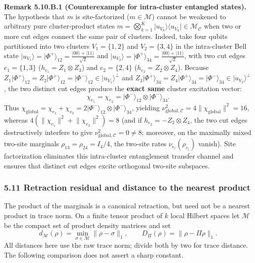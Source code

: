 \documentclass[
  11pt,
]{article}
\begin{document}
\textbf{Remark 5.10.B.1 (Counterexample for intra-cluster entangled states).} The hypothesis that \(m\) is site-factorized (\(m\in\mathcal{M}\)) cannot be weakened to arbitrary pure cluster-product states \(m = \bigotimes_{k=1}^K \lvert u_{V_k}\rangle\langle u_{V_k}\rvert \in \mathcal{M}_{\mathcal{C}}\) when two or more cut edges connect the same pair of clusters. Indeed, take four qubits partitioned into two clusters \(V_1=\{1,2\}\) and \(V_2=\{3,4\}\) in the intra-cluster Bell state \(\lvert u_{V_1}\rangle = \lvert\Phi^+\rangle_{12} = \frac{\lvert 00\rangle+\lvert 11\rangle}{\sqrt{2}}\) and \(\lvert u_{V_2}\rangle = \lvert\Phi^+\rangle_{34} = \frac{\lvert 00\rangle+\lvert 11\rangle}{\sqrt{2}}\), with two cut edges \(e_1=\{1,3\}\) (\(h_{e_1}=Z_1\otimes Z_3\)) and \(e_2=\{2,4\}\) (\(h_{e_2}=Z_2\otimes Z_4\)). Because \(Z_1\lvert\Phi^+\rangle_{12} = Z_2\lvert\Phi^+\rangle_{12} = \lvert\Phi^-\rangle_{12} \in \lvert u_{V_1}\rangle^\perp\) and \(Z_3\lvert\Phi^+\rangle_{34} = Z_4\lvert\Phi^+\rangle_{34} = \lvert\Phi^-\rangle_{34} \in \lvert u_{V_2}\rangle^\perp\), the two distinct cut edges produce the \textbf{exact same} cluster excitation vector:
\[
\chi_{e_1} = \chi_{e_2} = \lvert\Phi^-\rangle_{12}\otimes\lvert\Phi^-\rangle_{34}.
\]
Thus \(\chi_{\mathrm{global}} = \chi_{e_1} + \chi_{e_2} = 2\lvert\Phi^-\rangle_{12}\otimes\lvert\Phi^-\rangle_{34}\), yielding \(\nu_{\mathrm{global},\mathcal{C}}^2 = 4\lVert\chi_{\mathrm{global}}\rVert^2 = 16\), whereas \(4(\lVert\chi_{e_1}\rVert^2 + \lVert\chi_{e_2}\rVert^2) = 8\) (and if \(h_{e_2} = -Z_2\otimes Z_4\), the two cut edges destructively interfere to give \(\nu_{\mathrm{global},\mathcal{C}}^2 = 0 \ne 8\); moreover, on the maximally mixed two-site marginals \(\rho_{13}=\rho_{24}=I_4/4\), the two-site rates \(\nu_{e_i}(\rho_{e_i})\) vanish). Site factorization eliminates this intra-cluster entanglement transfer channel and ensures that distinct cut edges excite orthogonal two-site subspaces.

\subsubsection{5.11 Retraction residual and distance to the nearest product}\label{retraction-residual-and-distance-to-the-nearest-product}

The product of the marginals is a canonical retraction, but need not be a
nearest product in trace norm. On a finite tensor product of \(k\) local Hilbert
spaces let \(\mathcal M\) be the compact set of product density matrices and set
\[
d_{\mathcal M}(\rho)=\min_{\sigma\in\mathcal M}\lVert \rho-\sigma\rVert_1,
\qquad D_\Pi(\rho)=\lVert \rho-\Pi\rho\rVert_1.
\]
All distances here use the raw trace norm; divide both by two for trace distance.
The following comparison does not assert a sharp constant.
\end{document}
